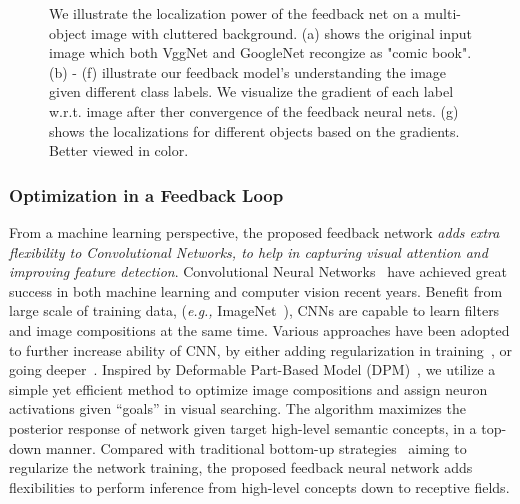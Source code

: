 \begin{figure}[htb]
\begin{center}
\begin{tabular}{ccccccc}
\end{tabular}
\caption{We illustrate the localization power of the feedback net on a multi-object image with cluttered background. (a) shows the original input image which both VggNet and GoogleNet recongize as "comic book". (b) - (f) illustrate our feedback model's understanding the image given different class labels. We visualize the gradient of each label w.r.t. image after ther convergence of the feedback neural nets. (g) shows the localizations for different objects based on the gradients. Better viewed in color.}
\label{fig:splah}
\end{center}
\end{figure}

\subsubsection*{Optimization in a Feedback Loop}
From a machine learning perspective, the proposed feedback network \emph{adds extra flexibility to Convolutional Networks, to help in capturing visual attention and improving feature detection}. Convolutional Neural Networks~\cite{lecun1998gradient, Krizhevsky2012ImageNet, Simonyan2014Very} have achieved great success in both machine learning and computer vision recent years. Benefit from large scale of training data, (\emph{e.g.,} ImageNet~\cite{deng2009imagenet}), CNNs are capable to learn filters and image compositions at the same time. Various approaches have been adopted to further increase ability of CNN, by either adding regularization in training~\cite{he2015delving,ioffe2015batch}, or going deeper~\cite{Simonyan2014Very, Szegedy2014Going}. Inspired by Deformable Part-Based Model (DPM)~\cite{Felzenszwalb2010Object}, we utilize a simple yet efficient method to optimize image compositions and assign neuron activations given ``goals'' in visual searching. The algorithm maximizes the posterior response of network given target high-level semantic concepts, in a top-down manner. Compared with traditional bottom-up strategies~\cite{he2015delving, ioffe2015batch} aiming to regularize the network training, the proposed feedback neural network adds flexibilities to perform inference from high-level concepts down to receptive fields.

